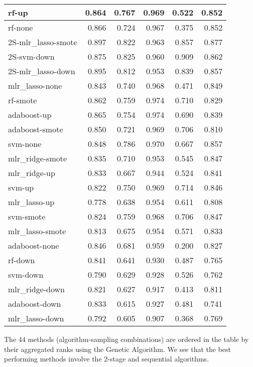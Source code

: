 \documentclass[
]{report}
\begin{document}
\begin{table}
\begin{tabular}[t]{l|r|r|r|r|r}
\hline
rf-up & 0.864 & 0.767 & 0.969 & 0.522 & 0.852\\
\hline
rf-none & 0.866 & 0.724 & 0.967 & 0.375 & 0.852\\
\hline
2S-mlr\_lasso-smote & 0.897 & 0.822 & 0.963 & 0.857 & 0.877\\
\hline
2S-svm-down & 0.875 & 0.825 & 0.960 & 0.909 & 0.862\\
\hline
2S-mlr\_lasso-down & 0.895 & 0.812 & 0.953 & 0.839 & 0.857\\
\hline
mlr\_lasso-none & 0.843 & 0.740 & 0.968 & 0.471 & 0.849\\
\hline
rf-smote & 0.862 & 0.759 & 0.974 & 0.710 & 0.829\\
\hline
adaboost-up & 0.865 & 0.754 & 0.974 & 0.690 & 0.839\\
\hline
adaboost-smote & 0.850 & 0.721 & 0.969 & 0.706 & 0.810\\
\hline
svm-none & 0.848 & 0.786 & 0.970 & 0.667 & 0.857\\
\hline
mlr\_ridge-smote & 0.835 & 0.710 & 0.953 & 0.545 & 0.847\\
\hline
mlr\_ridge-up & 0.833 & 0.667 & 0.944 & 0.524 & 0.841\\
\hline
svm-up & 0.822 & 0.750 & 0.969 & 0.714 & 0.846\\
\hline
mlr\_lasso-up & 0.778 & 0.638 & 0.954 & 0.611 & 0.808\\
\hline
svm-smote & 0.824 & 0.759 & 0.968 & 0.706 & 0.847\\
\hline
mlr\_lasso-smote & 0.813 & 0.675 & 0.954 & 0.571 & 0.833\\
\hline
adaboost-none & 0.846 & 0.681 & 0.959 & 0.200 & 0.827\\
\hline
rf-down & 0.841 & 0.641 & 0.930 & 0.487 & 0.765\\
\hline
svm-down & 0.790 & 0.629 & 0.928 & 0.526 & 0.762\\
\hline
mlr\_ridge-down & 0.821 & 0.627 & 0.917 & 0.413 & 0.811\\
\hline
adaboost-down & 0.833 & 0.615 & 0.927 & 0.481 & 0.741\\
\hline
mlr\_lasso-down & 0.792 & 0.605 & 0.907 & 0.368 & 0.769\\
\hline
\end{tabular}
\end{table}

The 44 methods (algorithm-sampling combinations) are ordered in the table by their aggregated ranks using the Genetic Algorithm. We see that the best performing methods involve the 2-stage and sequential algorithms.
\end{document}
